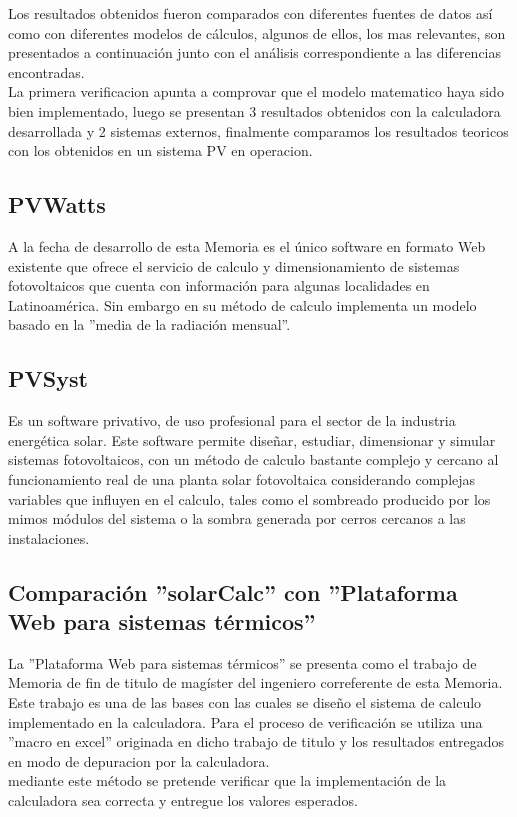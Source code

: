 Los resultados obtenidos fueron comparados con diferentes fuentes de datos así como con diferentes modelos de cálculos, algunos de ellos, los mas relevantes, son presentados a continuación junto con el análisis correspondiente a las diferencias encontradas.\\
La primera verificacion apunta a comprovar que el modelo matematico haya sido bien implementado, luego se presentan 3 resultados obtenidos con la calculadora desarrollada y 2 sistemas externos, finalmente comparamos los resultados teoricos con los obtenidos en un sistema PV en operacion.\\

\subsection{PVWatts}
A la fecha de desarrollo de esta Memoria es el único software en formato Web existente que ofrece el servicio de calculo y dimensionamiento de sistemas fotovoltaicos que cuenta con información para algunas localidades en Latinoamérica. Sin embargo en su método de calculo implementa un modelo basado en la ''media de la radiación mensual''.\\ 
\subsection{PVSyst}
Es un software privativo, de uso profesional para el sector de la industria energética solar. Este software permite diseñar, estudiar, dimensionar y simular sistemas fotovoltaicos, con un método de calculo bastante complejo y cercano al funcionamiento real de una planta solar fotovoltaica considerando complejas variables que influyen en el calculo, tales como el sombreado producido por los mimos módulos del sistema o la sombra generada por cerros cercanos a las instalaciones.\\

\subsection{Comparación ''solarCalc'' con ''Plataforma Web para sistemas térmicos''}
La ''Plataforma Web para sistemas térmicos'' se presenta como el trabajo de Memoria de fin de titulo de magíster del ingeniero correferente de esta Memoria\cite{memoriaEdo}. Este trabajo es una de las bases con las cuales se diseño el sistema de calculo implementado en la calculadora. Para el proceso de verificación se utiliza una ''macro en excel'' originada en dicho trabajo de titulo y los resultados entregados en modo de depuracion por la calculadora.\\
mediante este método se pretende verificar que la implementación de la calculadora sea correcta y entregue los valores esperados.

